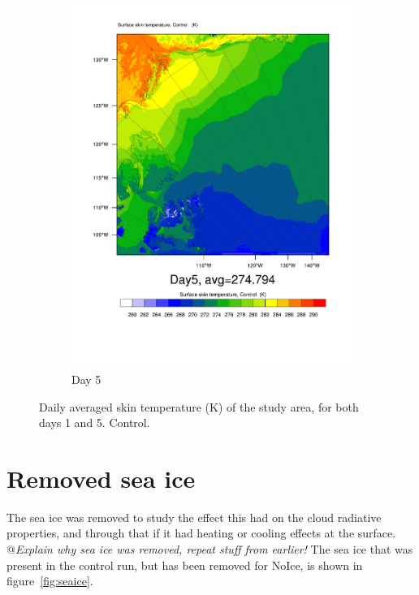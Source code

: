 \begin{figure}
\begin{subfigure}{0.48\textwidth}
		\includegraphics[width=\textwidth]{results/control/skintemp_day5.pdf}
		\caption{Day 5}
		\label{subfig:skin_r1Day5}
	\end{subfigure}
	\caption{Daily averaged skin temperature (K) of the study area, for both days 1 and 5. Control.}
	\label{fig:skintemp}
\end{figure}

\clearpage
\section{Removed sea ice}
The sea ice was removed to study the effect this had on the cloud radiative properties, and through that if it had heating or cooling effects at the surface. @\textit{Explain why sea ice was removed, repeat stuff from earlier!} The sea ice that was present in the control run, but has been removed for NoIce, is shown in figure~\ref{fig:seaice}. 

